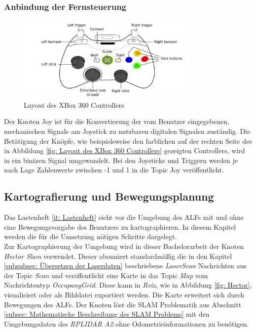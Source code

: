 		     \subsubsection{Anbindung der Fernsteuerung}
		     \label{subsubsec: Anbindung des Xbox-Controllers}
		     
		     \begin{figure}[H]
		     	\centering
		     	\includegraphics[width=0.8\textwidth]{Bilder/xboxcontroller.png}
		     	\caption{Layout des XBox 360 Controllers}
		     	\label{fig: Layout des XBox 360 Controllers}
		     \end{figure} 
		     
		     	Der Knoten Joy ist für die Konvertierung der vom Benutzer eingegebenen, mechanischen Signale am Joystick zu nutzbaren digitalen Signalen zuständig. Die Betätigung der Knöpfe, wie beispielsweise den farblichen auf der rechten Seite des in Abbildung \ref{fig:  Layout des XBox 360 Controllers} gezeigten Controllers, wird in ein binären Signal umgewandelt. Bei den Joysticks und Triggern werden je nach Lage Zahlenwerte zwischen -1 und 1 in die Topic Joy veröffentlicht. \cite{joy}
		     
		\subsection{Kartografierung und Bewegungsplanung}
		    \label{subsec: Kartografierung und Bewegungsplanung}
		        
		        Das Lastenheft \ref{it: Lastenheft} sieht vor die Umgebung des ALFs mit und ohne eine Bewegungsvorgabe des Benutzers zu kartographieren. In diesem Kapitel werden die für die Umsetzung nötigen Schritte dargelegt.\\
		    	
		    	Zur Kartographierung der Umgebung wird in dieser Bachelorarbeit der Knoten \textit{Hector Slam} verwendet.
		   		Dieser abonniert standardmäßig die in den Kapitel \ref{subsubsec: Übersetzen der Laserdaten} beschriebene \textit{LaserScan }Nachrichten aus der Topic \textit{Scan} und veröffentlicht eine Karte in das Topic \textit{Map} vom Nachrichtentyp \textit{OccupanyGrid}. Diese kann in \textit{Rviz}, wie in Abbildung \ref{fig: Hector}, visualisiert oder als Bilddatei exportiert werden. Die Karte erweitert sich durch Bewegungen des ALFs. Der Knoten löst die SLAM Problematik aus Abschnitt \ref{subsec: Mathematische Beschreibung des SLAM Problems} mit den Umgebungsdaten des \textit{RPLIDAR A2} ohne Odometrieinformationen zu benötigen. \cite{hectorslam}\\
		   				   		
